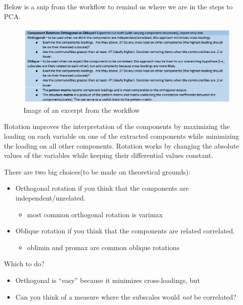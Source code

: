 \documentclass[
  english,
]{book}
\providecommand{\tightlist}{%
  \setlength{\itemsep}{0pt}\setlength{\parskip}{0pt}}
\begin{document}
Below is a snip from the workflow to remind us where we are in the steps to PCA.

\begin{figure}
\centering
\includegraphics{images/PCA/rotation.png}
\caption{Image of an excerpt from the workflow}
\end{figure}

Rotation improves the interpretation of the components by maximizing the loading on each variable on one of the extracted components while minimizing the loading on all other components. Rotation works by changing the absolute values of the variables while keeping their differential values constant.

There are two big choices(to be made on theoretical grounds):

\begin{itemize}
\tightlist
\item
  Orthogonal rotation if you think that the components are independent/unrelated.

  \begin{itemize}
  \tightlist
  \item
    most common orthogonal rotation is varimax
  \end{itemize}
\item
  Oblique rotation if you think that the components are related correlated.

  \begin{itemize}
  \tightlist
  \item
    oblimin and promax are common oblique rotations
  \end{itemize}
\end{itemize}

Which to do?

\begin{itemize}
\tightlist
\item
  Orthogonal is ``easy'' because it minimizes cross-loadings, but
\item
  Can you think of a measure where the subscales would \emph{not} be correlated?
\end{itemize}
\end{document}
